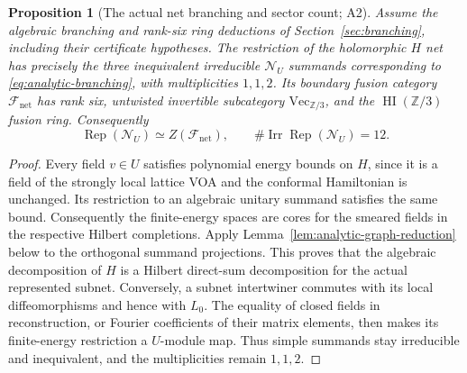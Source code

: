 \documentclass[11pt,a4paper]{article}
\newtheorem{proposition}[theorem]{Proposition}
\theoremstyle{definition}
\DeclareMathOperator{\Rep}{Rep}
\renewcommand{\Vec}{\mathrm{Vec}}
\begin{document}
\begin{proposition}[The actual net branching and sector count; A2]
\label{clm:analytic-net-count}
Assume the algebraic branching and rank-six ring deductions of
Section~\ref{sec:branching}, including their certificate hypotheses.
The restriction of the holomorphic $H$ net has precisely the three
inequivalent irreducible $\mathcal N_U$ summands corresponding to
\eqref{eq:analytic-branching}, with multiplicities $1,1,2$.
Its boundary fusion category $\mathcal F_{\mathrm{net}}$ has rank six,
untwisted invertible subcategory $\Vec_{\mathbb Z/3}$, and the
$\operatorname{HI}(\mathbb Z/3)$ fusion ring.  Consequently
\[
 \Rep(\mathcal N_U)\simeq Z(\mathcal F_{\mathrm{net}}),
 \qquad
 \#\operatorname{Irr}\Rep(\mathcal N_U)=12.
\]
\end{proposition}
\begin{proof}
Every field $v\in U$ satisfies polynomial energy bounds on $H$, since
it is a field of the strongly local lattice VOA and the conformal
Hamiltonian is unchanged.  Its restriction to an algebraic unitary
summand satisfies the same bound.  Consequently the finite-energy
spaces are cores for the smeared fields in the respective Hilbert
completions.  Apply Lemma~\ref{lem:analytic-graph-reduction} below to
the orthogonal summand projections.  This proves that the algebraic
decomposition of $H$ is a Hilbert direct-sum decomposition for the
actual represented subnet.  Conversely, a subnet intertwiner commutes
with its local diffeomorphisms and hence with $L_0$.  The equality of
closed fields in reconstruction, or Fourier coefficients of their
matrix elements, then makes its finite-energy restriction a
$U$-module map.  Thus simple summands stay irreducible and inequivalent,
and the multiplicities remain $1,1,2$.


\end{proof}
\end{document}
